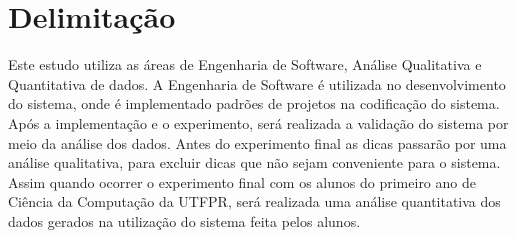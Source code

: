 \chapter{Delimitação}

Este estudo utiliza as áreas de Engenharia de Software, Análise Qualitativa e Quantitativa de dados. A Engenharia de Software é utilizada no desenvolvimento do sistema, onde é implementado padrões de projetos na codificação do sistema. Após a implementação e o experimento, será realizada a validação do sistema por meio da análise dos dados. Antes do experimento final as dicas passarão por uma análise qualitativa, para excluir dicas que não sejam conveniente para o sistema. Assim quando ocorrer o experimento final com os alunos do primeiro ano de Ciência da Computação da UTFPR, será realizada uma análise quantitativa dos dados gerados na utilização do sistema feita pelos alunos. 